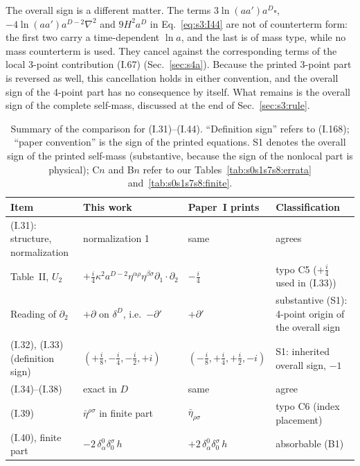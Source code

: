 \documentclass[aps,prd,onecolumn,10pt,nofootinbib,floatfix]{revtex4-2}
\newcommand{\PI}{Paper~I}
\newcommand{\eqI}[1]{(I.#1)}
\begin{document}
The overall sign is a different matter. The terms $3\ln(aa')a^D\square$,
$-4\ln(aa')a^{D-2}\nabla^2$ and $9H^2a^D$ in Eq.~\eqref{eq:s3:I44} are not of counterterm form:
the first two carry a time-dependent $\ln a$, and the last is of mass type, while no mass
counterterm is used. They cancel against the corresponding terms of the local 3-point
contribution \eqI{67} (Sec.~\ref{sec:s4a}). Because the printed 3-point part is reversed as well, this cancellation
holds in either convention, and the overall sign of the 4-point part has no consequence by
itself. What remains is the overall sign of the complete self-mass, discussed at the end of
Sec.~\ref{sec:s3:rule}.

\begin{table}[t]
\caption{Summary of the comparison for \eqI{31}--\eqI{44}. ``Definition sign'' refers to
\eqI{168}; ``paper convention'' is the sign of the printed equations. S1 denotes the overall sign of the printed self-mass
(substantive, because the sign of the nonlocal part is physical); C$n$ and B$n$ refer to our Tables~\ref{tab:s0s1s7s8:errata}
and~\ref{tab:s0s1s7s8:finite}.}
\label{tab:s3:summary}
\begin{ruledtabular}
\begin{tabular}{>{\raggedright\arraybackslash}p{}>{\raggedright\arraybackslash}p{}>{\raggedright\arraybackslash}p{}>{\raggedright\arraybackslash}p{}}
Item & This work & \PI{} prints & Classification\\
\hline
\eqI{31}: structure, normalization & normalization 1 & same & agrees\\
Table~II, $U_2$ & $+\frac i4\kappa^2a^{D-2}\eta^{\alpha\rho}\eta^{\beta\sigma}\partial_1\!\cdot\partial_2$
 & $-\frac i4$ & typo C5 ($+\frac i4$ used in \eqI{33})\\
Reading of $\partial_2$ & $+\partial$ on $\delta^D$, i.e.\ $-\partial'$ & $+\partial'$ & substantive (S1): 4-point origin of the overall sign\\
\eqI{32}, \eqI{33} (definition sign) & $(+\frac i8,-\frac i4,-\frac i2,+i)$ & $(-\frac i8,+\frac i4,+\frac i2,-i)$
 & S1: inherited overall sign, $-1$\\
\eqI{34}--\eqI{38} & exact in $D$ & same & agree\\
\eqI{39} & $\bar\eta^{\rho\sigma}$ in finite part & $\bar\eta_{\rho\sigma}$ & typo C6 (index placement)\\
\eqI{40}, finite part & $-2\,\delta^0_\alpha\delta^\sigma_0\,h$ & $+2\,\delta^0_\alpha\delta^\sigma_0\,h$ & absorbable (B1)\\

\end{tabular}
\end{ruledtabular}
\end{table}
\end{document}
